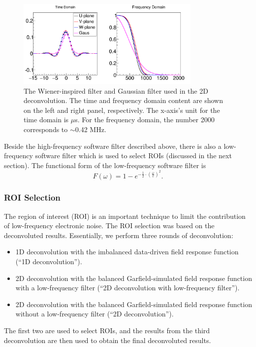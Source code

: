 \begin{figure}[!h!tbp]
\includegraphics[width=0.8\textwidth]{figures/filter_1.png}
\caption{The Wiener-inspired filter and Gaussian filter used in the 2D deconvolution. 
The time and frequency domain content are shown on the left and right panel, respectively.
The x-axis's unit for the time domain is $\mu$s. For the frequency domain, the number 2000
corresponds to $\sim$0.42 MHz.}
\label{fig:soft_filter_1}
\end{figure}

Beside the high-frequency software filter described above, there is also a low-frequency 
software filter which is used to select ROIs (discussed in the next section). 
The functional form of the low-frequency software filter is 
\begin{equation}
F(\omega) = 1- e^{-\frac{1}{2}\cdot \left( \frac{\omega}{c} \right)^2}.
\end{equation}

\subsubsection{ROI Selection}
The region of interest (ROI) is an important technique to limit the contribution of low-frequency 
electronic noise. The ROI selection was based on the deconvoluted results. Essentially, we perform
three rounds of deconvolution:
\begin{itemize}
\item 1D deconvolution with the imbalanced data-driven field response function (``1D deconvolution'').
\item 2D deconvolution with the balanced Garfield-simulated field response function with a low-frequency filter (``2D deconvolution with low-frequency filter'').
\item 2D deconvolution with the balanced Garfield-simulated field response function without a low-frequency filter (``2D deconvolution'').
\end{itemize}
The first two are used to select ROIs, and the results from the third deconvolution are then used to obtain the final 
deconvoluted results. 

